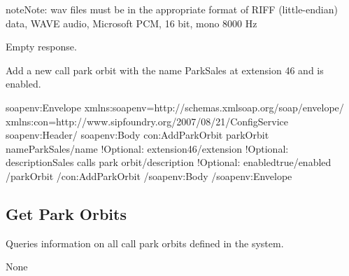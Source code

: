 \documentclass[letterpaper,10pt,english]{sphinxmanual}
\begin{document}
\begin{sphinxadmonition}{note}{Note:}
wav files must be in the appropriate format of RIFF (little-endian) data, WAVE audio, Microsoft PCM, 16 bit, mono 8000 Hz
\end{sphinxadmonition}

 Empty response.

 Add a new call park orbit with the name ParkSales at extension 46 and is enabled.

\begin{sphinxVerbatim}[commandchars=\\\{\}]
\PYGZlt{}soapenv:Envelope xmlns:soapenv=\PYGZdq{}http://schemas.xmlsoap.org/soap/envelope/\PYGZdq{} xmlns:con=\PYGZdq{}http://www.sipfoundry.org/2007/08/21/ConfigService\PYGZdq{}\PYGZgt{}
\PYGZlt{}soapenv:Header/\PYGZgt{}
\PYGZlt{}soapenv:Body\PYGZgt{}
\PYGZlt{}con:AddParkOrbit\PYGZgt{}
\PYGZlt{}parkOrbit\PYGZgt{}
\PYGZlt{}name\PYGZgt{}ParkSales\PYGZlt{}/name\PYGZgt{}
\PYGZlt{}!\PYGZhy{}Optional:\PYGZhy{}\PYGZgt{}
\PYGZlt{}extension\PYGZgt{}46\PYGZlt{}/extension\PYGZgt{}
\PYGZlt{}!\PYGZhy{}Optional:\PYGZhy{}\PYGZgt{}
\PYGZlt{}description\PYGZgt{}Sales calls park orbit\PYGZlt{}/description\PYGZgt{}
\PYGZlt{}!\PYGZhy{}Optional:\PYGZhy{}\PYGZgt{}
\PYGZlt{}enabled\PYGZgt{}true\PYGZlt{}/enabled\PYGZgt{}
\PYGZlt{}/parkOrbit\PYGZgt{}
\PYGZlt{}/con:AddParkOrbit\PYGZgt{}
\PYGZlt{}/soapenv:Body\PYGZgt{}
\PYGZlt{}/soapenv:Envelope\PYGZgt{}
\end{sphinxVerbatim}


\subsection{Get Park Orbits}
\label{\detokenize{soapapi:get-park-orbits}}
 

 Queries information on all call park orbits defined in the system.

 None

\end{document}
